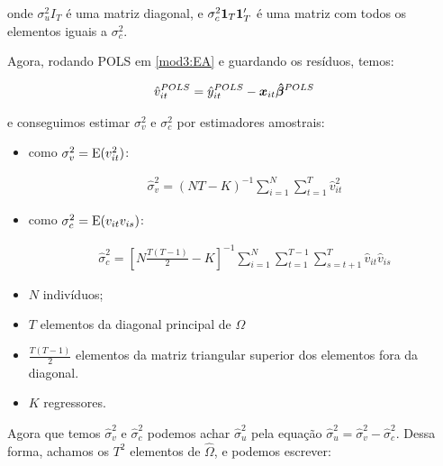 \documentclass[11pt, oneside, a4paper, article]{article}
\numberwithin{equation}{section}
\begin{document}
\noindent
onde
$\sigma^{2}_{u} I_{T}$ 
é uma matriz diagonal, e 
$\sigma_{c}^{2} \boldsymbol{1}_{T} \boldsymbol{1}_{T}'$ é uma matriz com todos os elementos iguais a $\sigma_{c}^{2}$.

Agora, rodando POLS em \eqref{mod3:EA} e guardando os resíduos, temos:

\vspace{-1 em}
\begin{align*}
\hat{v}_{it}^{POLS}
= 
\hat{y}_{it}^{POLS} - \boldsymbol{x}_{it} \boldsymbol{\hat{\beta}}^{POLS}
\end{align*}

\noindent
e conseguimos estimar $\sigma_{v}^{2}$ e $\sigma_{c}^{2}$ por estimadores amostrais:

\begin{itemize}\itemsep0pt
\item 
como $\sigma_{v}^{2} = \text{E}(v_{it}^{2})$:

\vspace{-1.5 em}
\begin{align*}
\hat{\sigma}_{v}^{2} =
(NT - K)^{-1} 
\sum_{i=1}^{N}
\sum_{t=1}^{T}
\hat{v}_{it}^2
\end{align*}
\vspace{-1.5 em}

\item 
como $\sigma_{c}^{2} = \text{E}(v_{it} v_{is})$:

\vspace{-1.5 em}
\begin{align*}
\hat{\sigma}_{c}^{2} =
\left[ N \frac{T ( T-1 )}{2} - K  \right]^{-1}
\sum_{i=1}^{N}
\sum_{t=1}^{T-1}
\sum_{s=t+1}^{T}
\hat{v}_{it} \hat{v}_{is}
\end{align*}
\vspace{-1.5 em}

\item $N$ indivíduos;

\item $T$ elementos da diagonal principal de $\Omega$

\item $\frac{T ( T - 1)}{2}$ elementos da matriz triangular superior dos elementos fora da diagonal.

\item $K$ regressores.
\end{itemize}

Agora que temos $\hat{\sigma}^2_{v}$ e $\hat{\sigma}^2_{c}$ podemos achar $\hat{\sigma}^{2}_{u}$ pela equação $\boxed{\hat{\sigma}_{u}^{2} = \hat{\sigma}_{v}^{2} - \hat{\sigma}_{c}^{2}}$.
Dessa forma, achamos os $T^2$ elementos de $\widehat{\Omega}$, e podemos escrever:
\end{document}
